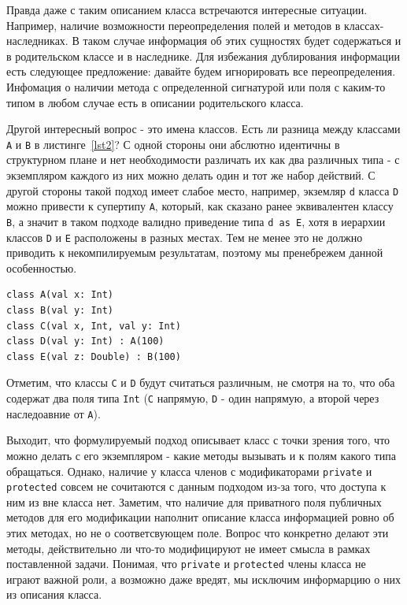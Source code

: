 \documentclass[times,specification,annotation]{itmo-student-thesis}
\begin{document}
Правда даже с таким описанием класса встречаются интересные ситуации. Например, наличие возможности переопределения полей и методов в классах-наследниках. В таком случае информация об этих сущностях будет содержаться и в родительском классе и в наследнике. Для избежания дублирования информации есть следующее предложение: давайте будем игнорировать все переопределения. Инфомация о наличии метода с определенной сигнатурой или поля с каким-то типом в любом случае есть в описании родительского класса.

Другой интересный вопрос - это имена классов. Есть ли разница между классами \texttt{A} и \texttt{B} в листинге~\ref{lst2}? С одной стороны они абслютно идентичны в структурном плане и нет необходимости различать их как два различных типа - с экземпляром каждого из них можно делать один и тот же набор действий. С другой стороны такой подход имеет слабое место, например, экземляр \texttt{d} класса \texttt{D} можно привести к супертипу \texttt{A}, который, как сказано ранее эквивалентен классу \texttt{B}, а значит в таком подходе валидно приведение типа \texttt{d as E}, хотя в иерархии классов \texttt{D} и \texttt{E} расположены в разных местах. Тем не менее это не должно приводить к некомпилируемым результатам, поэтому мы пренебрежем данной особенностью.

\begin{lstlisting}[float=!h,caption={Пример исходного кода на Kotlin},label={lst2}]
class A(val x: Int)
class B(val y: Int)
class C(val x, Int, val y: Int)
class D(val y: Int) : A(100)
class E(val z: Double) : B(100)
\end{lstlisting}

Отметим, что классы \texttt{C} и \texttt{D} будут считаться различным, не смотря на то, что оба содержат два поля типа \texttt{Int} (\texttt{C} напрямую, \texttt{D} - один напрямую, а второй через наследоавние от \texttt{А}).

Выходит, что формулируемый подход описывает класс с точки зрения того, что можно делать с его экземпляром - какие методы вызывать и к полям какого типа обращаться. Однако, наличие у класса членов с модификаторами \texttt{private} и \texttt{protected} совсем не сочитаются с данным подходом из-за того, что доступа к ним из вне класса нет. Заметим, что наличие для приватного поля публичных методов для его модификации наполнит описание класса информацией ровно об этих методах, но не о соответсвующем поле. Вопрос что конкретно делают эти методы, действительно ли что-то модифицируют не имеет смысла в рамках поставленной задачи. Понимая, что \texttt{private} и \texttt{protected} члены класса не играют важной роли, а возможно даже вредят, мы исключим информарцию о них из описания класса.
\end{document}
